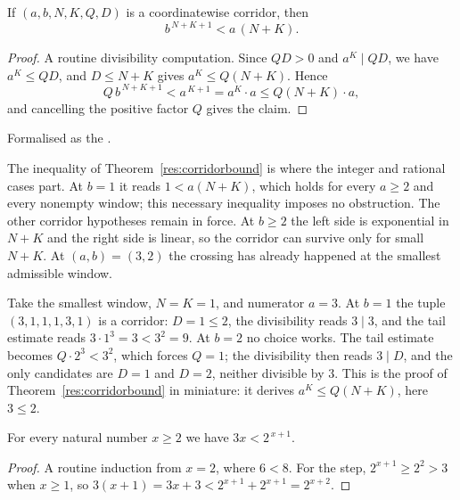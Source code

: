 \documentclass[11pt]{article}
\begin{document}
\begin{theorem}\label{res:corridorbound}
If $(a,b,N,K,Q,D)$ is a coordinatewise corridor, then
\[
 b^{\,N+K+1}<a\,(N+K).
\]
\end{theorem}

\begin{proof}
A routine divisibility computation.  Since $QD>0$ and $a^{K}\mid QD$, we have
$a^{K}\le QD$, and $D\le N+K$ gives
$a^{K}\le Q(N+K)$.  Hence
\[
 Q\,b^{\,N+K+1}<a^{\,K+1}=a^{K}\cdot a\le Q(N+K)\cdot a,
\]
and cancelling the positive factor $Q$ gives the claim.
\end{proof}

\noindent Formalised as the
.

The inequality of Theorem~\ref{res:corridorbound} is where the integer and
rational cases part.  At $b=1$ it reads $1<a(N+K)$, which holds for every
$a\ge2$ and every nonempty window; this necessary inequality imposes no
obstruction.  The other corridor hypotheses remain in force.
At $b\ge2$ the left side is exponential in $N+K$ and the right side is linear,
so the corridor can survive only for small $N+K$.  At $(a,b)=(3,2)$ the
crossing has already happened at the smallest admissible window.

\begin{example}\label{ex:corridor}
Take the smallest window, $N=K=1$, and numerator $a=3$.  At $b=1$ the tuple
$(3,1,1,1,3,1)$ is a corridor: $D=1\le2$, the divisibility reads $3\mid3$, and
the tail estimate reads $3\cdot1^{3}=3<3^{2}=9$.  At $b=2$ no choice works.  The
tail estimate becomes $Q\cdot2^{3}<3^{2}$, which forces $Q=1$; the divisibility
then reads $3\mid D$, and the only candidates are $D=1$ and $D=2$, neither
divisible by $3$.  This is the proof of
Theorem~\ref{res:corridorbound} in miniature: it derives $a^{K}\le Q(N+K)$,
here $3\le2$.
\end{example}

\begin{proposition}\label{res:exp}
For every natural number $x\ge2$ we have $3x<2^{\,x+1}$.
\end{proposition}

\begin{proof}
A routine induction from $x=2$, where $6<8$.  For the step, $2^{x+1}\ge2^{2}>3$ when
$x\ge1$, so $3(x+1)=3x+3<2^{x+1}+2^{x+1}=2^{x+2}$.
\end{proof}
\end{document}
